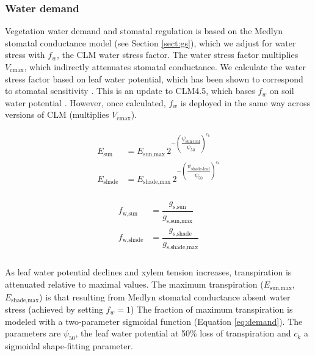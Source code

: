 \documentclass[draft,linenumbers]{agujournal}
\begin{document}
    \subsubsection{Water demand}
    \label{sect:demand}
    
    Vegetation water demand and stomatal regulation is based on the Medlyn stomatal conductance model (see Section \ref{sect:gs}), 
    which we adjust for water stress with $f_w$, the CLM water stress factor. 
    The water stress factor multiplies $V_{\text{cmax}}$, which indirectly attenuates stomatal conductance.
    We calculate the water stress factor based on leaf water potential, which has been shown to correspond to stomatal sensitivity \citep{klein2014}.
    This is an update to CLM4.5, which bases $f_w$ on soil water potential \citep{oleson2013}.
    However, once calculated, $f_w$ is deployed in the same way across versions of CLM (multiplies $V_{\text{cmax}}$).

     \begin{linenomath*}
     \begin{eqnarray}
     \begin{aligned}
     \label{eq:demand}
     E_{\text{sun}}     &= E_{\text{sun,max}} \, 2^{-\left(\dfrac{\psi_{\text{sun-leaf}}}{\psi_{50}}\right)^{c_k}} \\
     E_{\text{shade}} &= E_{\text{shade,max}} \, 2^{-\left(\dfrac{\psi_{\text{shade-leaf}}}{\psi_{50}}\right)^{c_k}}
     \end{aligned}
     \end{eqnarray}
     \end{linenomath*}
    
    
     \begin{linenomath*}
     \begin{eqnarray}
     \begin{aligned}
     \label{eq:stress}
     f_{\text{w,sun}}         &= \dfrac{g_{\text{s,sun}}}{g_{\text{s,sun,max}}} \\
     f_{\text{w,shade}}     &= \dfrac{g_{\text{s,shade}}}{g_{\text{s,shade,max}}} \\
     \end{aligned}
     \end{eqnarray}
     \end{linenomath*}
    
     As leaf water potential declines and xylem tension increases, transpiration is attenuated relative to maximal values.
     The maximum transpiration ($E_{\text{sun,max}}$, $E_{\text{shade,max}}$) is that resulting from Medlyn stomatal conductance absent water stress (achieved by setting $f_w=1$)
     The fraction of maximum transpiration is modeled with a two-parameter sigmoidal function (Equation \ref{eq:demand}). 
     The parameters are $\psi_{50}$, the leaf water potential at 50\% loss of transpiration and 
     $c_k$ a sigmoidal shape-fitting parameter.
    
\end{document}
